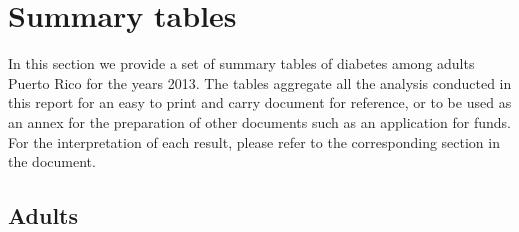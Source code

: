 \newpage
\section{Summary tables}
In this section we provide a set of summary tables of diabetes among adults Puerto Rico for the years 2013. The tables aggregate all the analysis conducted in this report for an easy to print and carry document for reference, or to be used as an annex for the preparation of other documents such as an application for funds. For the interpretation of each result, please refer to the corresponding section in the document.

\subsection{Adults}

